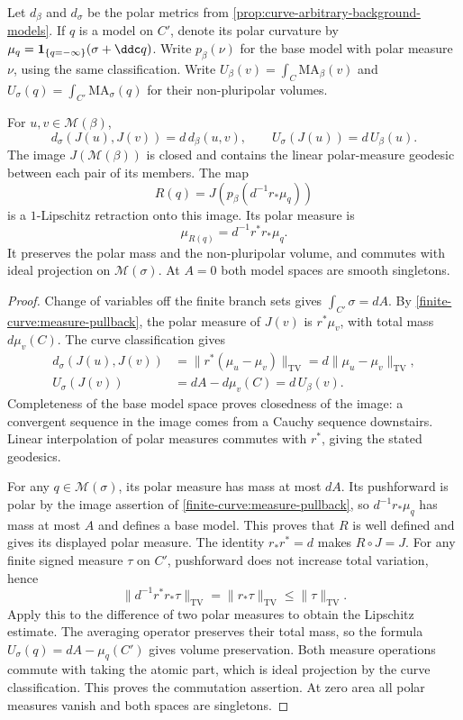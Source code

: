 Let $d_\beta$ and $d_\sigma$ be the polar metrics from
\cref{prop:curve-arbitrary-background-models}. If $q$ is a model
on $C'$, denote its polar curvature by
$\mu_q=\mathbf1_{\{q=-\infty\}}(\sigma+\ddc q)$.
Write $p_\beta(\nu)$ for the base model with polar measure
$\nu$, using the same classification.
Write $U_\beta(v)=\int_C\mathrm{MA}_\beta(v)$ and
$U_\sigma(q)=\int_{C'}\mathrm{MA}_\sigma(q)$ for their
non-pluripolar volumes.

\begin{proposition}\label{finite-curve:model-retraction}
For $u,v\in\mathcal M(\beta)$,
\[
 d_\sigma(J(u),J(v))=d\,d_\beta(u,v),\qquad
 U_\sigma(J(u))=d\,U_\beta(u).
\]
The image $J(\mathcal M(\beta))$ is closed and contains the
linear polar-measure geodesic between each pair of its members.
The map
\[
 R(q)=J\!\left(p_\beta\!\left(d^{-1}r_*\mu_q\right)\right)
\]
is a $1$-Lipschitz retraction onto this image. Its polar measure is
\[
 \mu_{R(q)}=d^{-1}r^*r_*\mu_q.
\]
It preserves the polar mass and the non-pluripolar volume,
and commutes with ideal projection on $\mathcal M(\sigma)$.
At $A=0$ both model spaces are smooth singletons.
\end{proposition}
\begin{proof}
Change of variables off the finite branch sets gives
$\int_{C'}\sigma=dA$.
By \cref{finite-curve:measure-pullback}, the polar measure of
$J(v)$ is $r^*\mu_v$, with total mass $d\mu_v(C)$.
The curve classification gives
\[
 \begin{aligned}
 d_\sigma(J(u),J(v))
   &=\|r^*(\mu_u-\mu_v)\|_{\mathrm{TV}}
     =d\|\mu_u-\mu_v\|_{\mathrm{TV}},\\
 U_\sigma(J(v))
   &=dA-d\mu_v(C)=d\,U_\beta(v).
 \end{aligned}
\]
Completeness of the base model space proves closedness of the
image: a convergent sequence in the image comes from a
Cauchy sequence downstairs. Linear interpolation of polar
measures commutes with $r^*$, giving the stated geodesics.

For any $q\in\mathcal M(\sigma)$, its polar measure has mass
at most $dA$. Its pushforward is polar by the image assertion
of \cref{finite-curve:measure-pullback}, so
$d^{-1}r_*\mu_q$ has mass at most $A$ and defines a base model.
This proves that $R$ is well defined and gives its displayed
polar measure. The identity $r_*r^*=d$ makes $R\circ J=J$.
For any finite signed measure $\tau$ on $C'$,
pushforward does not increase total variation, hence
\[
 \|d^{-1}r^*r_*\tau\|_{\mathrm{TV}}
       =\|r_*\tau\|_{\mathrm{TV}}
       \leq\|\tau\|_{\mathrm{TV}}.
\]
Apply this to the difference of two polar measures to obtain
the Lipschitz estimate.
The averaging operator preserves their total mass, so the
formula $U_\sigma(q)=dA-\mu_q(C')$ gives volume preservation.
Both measure operations commute with taking the atomic part,
which is ideal projection by the curve classification.
This proves the commutation assertion. At zero area all
polar measures vanish and both spaces are singletons.
\end{proof}

